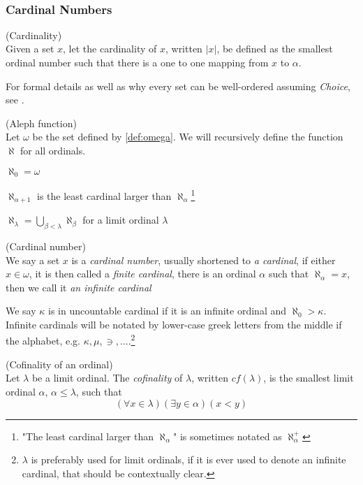 \

\subsubsection{Cardinal Numbers}

\begin{definition}{(Cardinality)}\\
Given a set $x$, let the cardinality of $x$, written $|x|$, be defined as the smallest ordinal number such that there is a one to one mapping from $x$ to $\alpha$.
\end{definition}
For formal details as well as why every set can be well-ordered assuming \emph{Choice}, see \cite{JechBook}.

\begin{definition}{(Aleph function)}\label{def:aleph}\\
Let $\omega$ be the set defined by \ref{def:omega}.
We will recursively define the function $\aleph$ for all ordinals.
\bce[(i)]
\item $\aleph_0 = \omega$
\item $\aleph_{\alpha+1}$ is the least cardinal larger than $\aleph_\alpha$\footnote{"The least cardinal larger than $\aleph_\alpha$" is sometimes notated as $\aleph_\alpha^{+}$}
\item $\aleph_\lambda = \bigcup_{\beta < \lambda}\aleph_\beta$ for a limit ordinal $\lambda$
\ece
\end{definition}

\begin{definition}{(Cardinal number)}\label{def:cardinal}\\
We say a set $x$ is a \emph{cardinal number}, usually shortened to \emph{a cardinal}, if either $x \in \omega$, it is then called a \emph{finite cardinal}, 
there is an ordinal $\alpha$ such that $\aleph_\alpha = x$, then we call it \emph{an infinite cardinal}
\end{definition}
We say $\kappa$ is in uncountable cardinal if it is an infinite ordinal and $\aleph_0 > \kappa$.
Infinite cardinals will be notated by lower-case greek letters from the middle if the alphabet, e.g. $\kappa, \mu, \ni, \ldots$.\footnote{$\lambda$ is preferably used for limit ordinals, if it is ever used to denote an infinite cardinal, that should be contextually clear.}

\begin{definition}{(Cofinality of an ordinal)}\label{def:cofinality}\\ %
Let $\lambda$ be a limit ordinal. The \emph{cofinality} of $\lambda$, written $cf(\lambda)$, is the smallest limit ordinal $\alpha$, $\alpha \leq \lambda$, such that 
\begin{equation}
(\forall x \in \lambda)(\exists y \in \alpha)(x < y)
\end{equation}
\end{definition}

